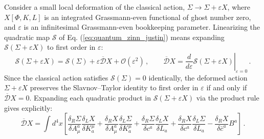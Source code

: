 Consider a small local deformation of the classical action, \(\Sigma \rightarrow \Sigma + \varepsilon X\), where \(X[\Phi, K, L]\) is an integrated Grassmann-even functional of ghost number zero, and \(\varepsilon\) is an infinitesimal Grassmann-even bookkeeping parameter. Linearizing the quadratic map \(\mathcal{S}\) of Eq. (\ref{eq:quantum_zinn_justin}) means expanding \(\mathcal{S}(\Sigma + \varepsilon X)\) to first order in \(\varepsilon\):
\begin{equation} \label{eq:linearization_def}
    \mathcal{S}(\Sigma + \varepsilon X) = \mathcal{S}(\Sigma) + \varepsilon \overline{\mathcal{D}} X + \mathcal{O}(\varepsilon^2) \, , \qquad \overline{\mathcal{D}} X = \left. \frac{d}{d\varepsilon} \mathcal{S}(\Sigma + \varepsilon X) \right|_{\varepsilon=0} \, .
\end{equation}
Since the classical action satisfies \(\mathcal{S}(\Sigma) = 0\) identically, the deformed action \(\Sigma + \varepsilon X\) preserves the Slavnov--Taylor identity to first order in \(\varepsilon\) if and only if \(\overline{\mathcal{D}} X = 0\). Expanding each quadratic product in \(\mathcal{S}(\Sigma + \varepsilon X)\) via the product rule gives explicitly:
\begin{equation} \label{eq:d_bar_even_X}
    \overline{\mathcal{D}} X = \int d^4x \left[ \frac{\delta_R \Sigma}{\delta A_\mu^a} \frac{\delta_L X}{\delta K_a^\mu} + \frac{\delta_R X}{\delta A_\mu^a} \frac{\delta_L \Sigma}{\delta K_a^\mu} + \frac{\delta_R \Sigma}{\delta c^a} \frac{\delta_L X}{\delta L_a} + \frac{\delta_R X}{\delta c^a} \frac{\delta_L \Sigma}{\delta L_a} - \frac{\delta_R X}{\delta \bar{c}^a} B^a \right] \, .
\end{equation}

